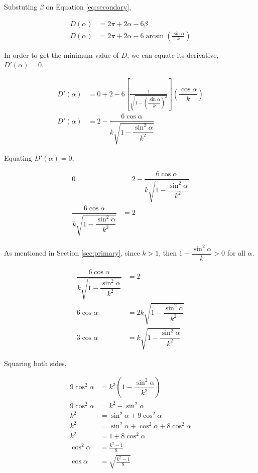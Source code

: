 \documentclass[a4paper,12pt]{article}
\begin{document}
Substuting $\beta$ on Equation \eqref{eq:secondary},

\begin{align}
D(\alpha) &= 2\pi + 2\alpha - 6\beta \nonumber\\
D(\alpha) &= 2\pi + 2\alpha - 6 \arcsin \left( \frac{\sin \alpha}{k} \right)
\end{align}

In order to get the minimum value of $D$, we can equate its derivative, $D'(\alpha) = 0$.

\begin{align}
D'(\alpha) &= 0 + 2 - 6 \left[ \frac{1}{\sqrt{1- \left( \dfrac{\sin \alpha}{k}\right)^2}}\right]\left(\dfrac{\cos \alpha}{k}\right) \nonumber\\
D'(\alpha) &= 2 - \dfrac{6\cos \alpha}{k\sqrt{1-\dfrac{\sin^2 \alpha}{k^2}}}
\end{align}

Equating $D'(\alpha) = 0$,

\begin{align}
0 &= 2 - \dfrac{6\cos \alpha}{k\sqrt{1-\dfrac{\sin^2 \alpha}{k^2}}}\nonumber\\
\dfrac{6\cos \alpha}{k\sqrt{1-\dfrac{\sin^2 \alpha}{k^2}}} &= 2
\end{align}

As mentioned in Section \ref{sec:primary}, since $k>1$, then $1-\dfrac{\sin^2 \alpha}{k} >0$ for all $\alpha$.

\begin{align}
\dfrac{6\cos \alpha}{k\sqrt{1-\dfrac{\sin^2 \alpha}{k^2}}} &= 2\nonumber\\
6\cos \alpha &= 2k\sqrt{1-\dfrac{\sin^2 \alpha}{k^2}}\nonumber\\
3\cos \alpha &= k\sqrt{1-\dfrac{\sin^2 \alpha}{k^2}}
\end{align}

Squaring both sides,

\begin{align}
9\cos^2 \alpha &= k^2\left( 1- \dfrac{\sin^2\alpha}{k^2}\right) \nonumber\\
9\cos^2 \alpha &= k^2 - \sin^2 \alpha \nonumber\\
k^2 &= \sin^2 \alpha +9 \cos^2 \alpha \nonumber\\
k^2 &= \sin^2 \alpha + \cos^2 \alpha + 8\cos^2 \alpha \nonumber\\
k^2 &= 1 + 8\cos^2 \alpha \nonumber\\
\cos^2 \alpha &= \frac{k^2-1}{8} \nonumber\\
\cos \alpha &= \sqrt{\frac{k^2-1}{8}} \nonumber\\
\end{align}
\end{document}
